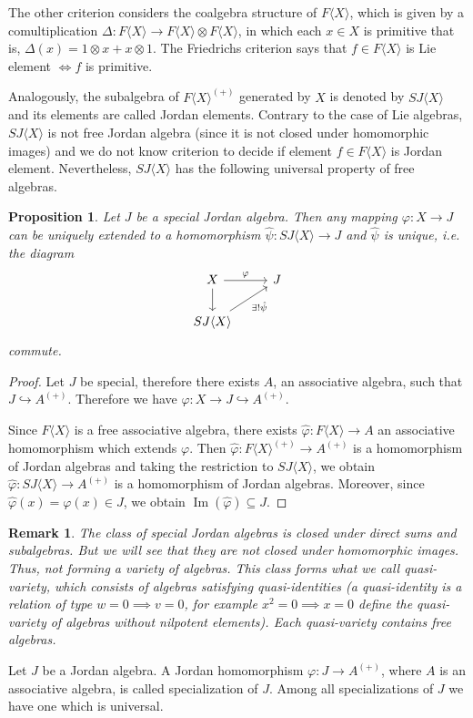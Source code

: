 \documentclass{article}
\newtheorem{proposition}[theorem]{Proposition}
\newtheorem{remark}[theorem]{Remark}
\begin{document}
The other criterion considers the coalgebra structure of $F\langle X \rangle$, which is given by a comultiplication $\Delta: F\langle X \rangle \to F\langle X \rangle \otimes F\langle X \rangle$, in which each $x \in X$ is primitive that is, $\Delta(x)=1\otimes x + x\otimes 1$. The Friedrichs criterion says that $f \in F\langle X \rangle$ is Lie element $\iff f$ is primitive.  

Analogously, the subalgebra of $F\langle X \rangle^{(+)}$ generated by $X$ is denoted by $SJ\langle X \rangle$ and its elements are called Jordan elements. Contrary to the case of Lie algebras, $SJ\langle X \rangle$ is not free Jordan algebra (since it is not closed under homomorphic images) and we do not know criterion to decide if element $f \in F\langle X \rangle$ is Jordan element. Nevertheless, $SJ\langle X \rangle$ has the following universal property of free algebras.  

\begin{proposition}Let $J$ be a special Jordan algebra. Then any mapping $\varphi: X \to J$ can be uniquely extended to a homomorphism $\hat{\psi}: SJ\langle X \rangle \to J$ and $\hat{\psi}$ is unique, i.e. the diagram  
\[  
\begin{tikzcd}  
X \arrow[r, "\varphi"] \arrow[d] & J \\
SJ\langle X \rangle \arrow[ru, "\exists ! \hat{\psi}"'] &  
\end{tikzcd}  
\]  
commute.  
\end{proposition}
\begin{proof} 
Let $J$ be special, therefore there exists $A$, an associative algebra, such that $J \hookrightarrow A^{(+)}$. Therefore we have $\varphi: X \to J \hookrightarrow A^{(+)}$.  

Since $F\langle X \rangle$ is a free associative algebra, there exists $\hat{\varphi}: F\langle X \rangle \to A$ an associative homomorphism which extends $\varphi$. Then $\hat{\varphi}: F\langle X \rangle^{(+)} \to A^{(+)}$ is a homomorphism of Jordan algebras and taking the restriction to $SJ\langle X \rangle$, we obtain $\hat{\varphi}: SJ\langle X \rangle \to A^{(+)}$ is a homomorphism of Jordan algebras. Moreover, since $\hat{\varphi}(x) = \varphi(x) \in J$, we obtain $\operatorname{Im}(\hat{\varphi}) \subseteq J$.  
\end{proof}

\begin{remark} The class of special Jordan algebras is closed under direct sums and subalgebras. But we will see that they are not closed under homomorphic images. Thus, not forming a variety of algebras. This class forms what we call quasi-variety, which consists of algebras satisfying quasi-identities (a quasi-identity is a relation of type $w=0 \implies v=0$, for example $x^2 = 0 \implies x=0$ define the quasi-variety of algebras without nilpotent elements). Each quasi-variety contains free algebras.  
\end{remark}
Let $J$ be a Jordan algebra. A Jordan homomorphism $\varphi: J \to A^{(+)}$, where $A$ is an associative algebra, is called specialization of $J$. Among all specializations of $J$ we have one which is universal.  
\end{document}
